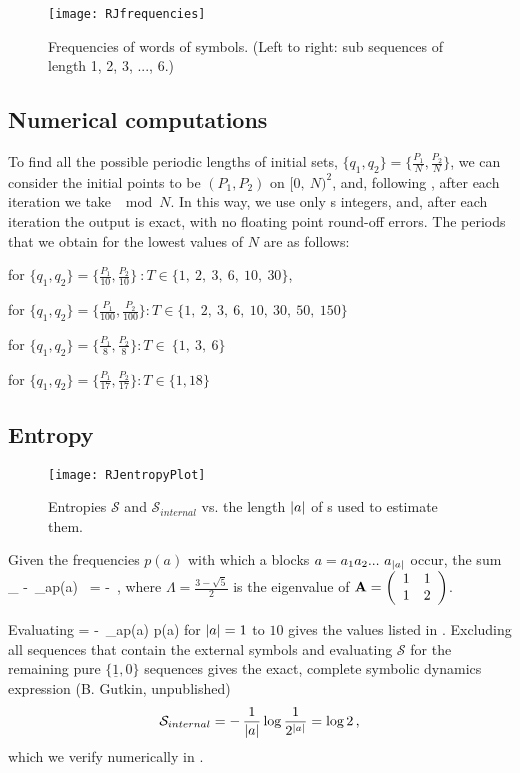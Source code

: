\begin{figure}
	\centering
	\texttt{[image: RJfrequencies]}
	\caption{\label{RJfrequencies}
Frequencies of words of symbols. (Left to right: sub sequences of length
1, 2, 3, ..., 6.)
            }
\end{figure}



\subsection{Numerical computations}

To find all the possible periodic lengths of initial sets, $\{q_1, q_2\}
= \{\frac{P_1}{N},\frac{P_2}{N}\}$, we can consider the initial points to
be $(P_1, P_2)$ on $ [0, \ N)^2$, and, following  ,
after each iteration we take $\mod N$. In this way, we use only s
integers, and, after each iteration the output is exact, with no floating
point round-off errors.
The periods that we obtain for the lowest values of $N$ are as follows:
\par for $\{q_1, q_2\} = \{\frac{P_1}{10},\frac{P_2}{10}\} \ : T \in \{1,\ 2,\ 3, \ 6, \ 10, \ 30\}$,
\par for $ \{q_1, q_2\} = \{\frac{P_1}{100},\frac{P_2}{100}\} : T \in \{1, \ 2, \ 3, \ 6, \ 10, \ 30, \  50, \ 150\}$
\par for $\{q_1, q_2\} = \{\frac{P_1}{8},\frac{P_2}{8}\} : T \in \ \{1, \ 3, \ 6\}$
\par for $\{q_1, q_2\} = \{\frac{P_1}{17},\frac{P_2}{17}\} : T \in \{1, 18\}$


\subsection{Entropy}

\begin{figure}	
	\texttt{[image: RJentropyPlot]}
	\caption{\label{fig:RJentropyPlot}
Entropies $\mathcal{S}$ and $\mathcal{S}_{internal}$
vs. the length ${|a|}$ of \po s used to estimate them.
    }
\end{figure}


Given the frequencies $p(a)$ with which a blocks
$ a = a_1 a_2 ...\ a_{\cl{a}}$ occur, the sum
\beq
\lim_{\to\infty} -\, \sum_{a}{p(a) }\ = - \log \Lambda
\,,
where $ \Lambda = \frac{3 - \sqrt{5}}{2} $ is the eigenvalue of  $ \bf{A} = \left (
		\begin{array}{cc}
		1&1\\
		1&2\\
		\end{array} \right) $.
\par
Evaluating
\beq
{} =  -\, \sum_{a}{p(a) \log p(a)}
for ${|a|} = 1$ to $10$ gives the values listed in .
Excluding all sequences that contain the external symbols and evaluating
$\mathcal{S}$ for the remaining pure  $\{ \underline{1},0\}$ sequences gives the exact,
complete symbolic dynamics expression (B. Gutkin, unpublished)
\[
\mathcal{S}_{internal} =  -\,\frac{1}{{|a|}} \log \frac{1}{2^{{|a|}}} = \log 2
\,,
\]
which we verify numerically in .


